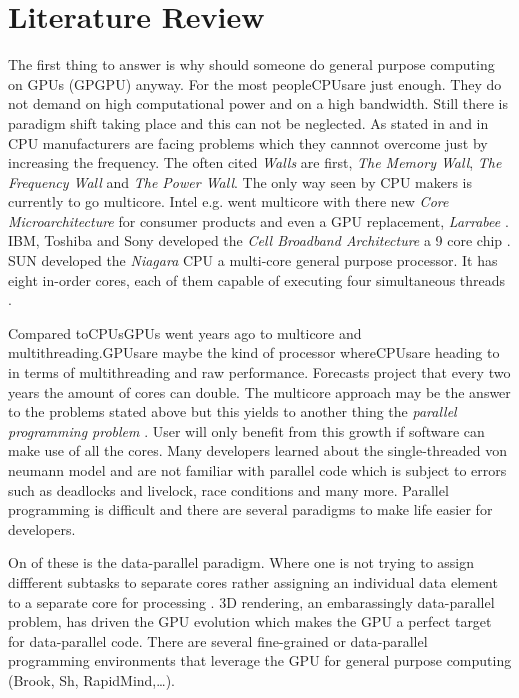 
\chapter{Literature Review}\label{ch:literature_review}

The first thing to answer is why should someone do general purpose computing on
GPUs (GPGPU) anyway. For the most people\glspl{CPU}are just enough. They do not
demand on high computational power and on a high bandwidth. Still there is
paradigm shift taking place and this can not be neglected. As stated in
\citep{citeulike:1187394} and in \citep{citeulike:3421647} CPU manufacturers are
facing problems which they cannnot overcome just by increasing the frequency.
The often cited \emph{Walls} are first, \emph{The Memory
Wall}\citep{citeulike:457955}, \emph{The Frequency Wall} and \emph{The Power
Wall}. The only way seen by CPU makers is currently to go multicore. Intel e.g.
went multicore with there new \emph{Core Microarchitecture} for consumer
products and even a \gls{GPU} replacement, \emph{Larrabee} \citep{citeulike:3153758}.
IBM, Toshiba and Sony developed the \emph{Cell Broadband Architecture} a 9 core
chip \citep{citeulike:1243173}. SUN developed the \emph{Niagara} CPU a multi-core
general purpose processor. It has eight in-order cores, each of them capable of
executing four simultaneous threads \citep{citeulike:3743958}.

Compared to\glspl{CPU}GPUs went years ago to multicore and multithreading.\glspl{GPU}are
maybe the kind of processor where\glspl{CPU}are heading to in terms of multithreading
and raw performance. Forecasts project that every two years the amount of cores
can double. The multicore approach may be the answer to the problems stated
above but this yields to another thing the \emph{parallel programming problem}
\citep{citeulike:3750573}. User will only benefit from this growth if software
can make use of all the cores. Many developers learned about the
single-threaded von neumann model and are not familiar with parallel code which
is subject to errors such as deadlocks and livelock, race conditions and many
more. Parallel programming is difficult and there are several paradigms to make
life easier for developers. 

On of these is the data-parallel paradigm. Where one
is not trying to assign diffferent subtasks to separate cores rather assigning
an individual data element to a separate core for processing
\citep{citeulike:3750565}. 3D rendering, an embarassingly data-parallel problem,
has driven the \gls{GPU} evolution which makes the \gls{GPU} a perfect target for
data-parallel code. There are several fine-grained or data-parallel programming
environments that leverage the \gls{GPU} for general purpose computing (Brook, Sh,
RapidMind,\ldots). 

